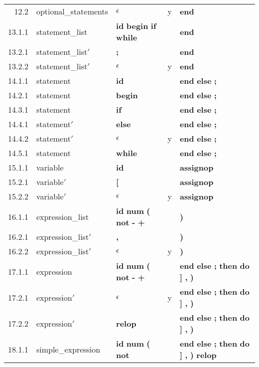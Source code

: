 \begin{center}
\begin{tabular}{rllll}
12.2 & optional\_statements & $\epsilon$ & y & \textbf{end}\\
13.1.1 & statement\_list & \textbf{id} \textbf{begin} \textbf{if} \textbf{while} &  & \textbf{end}\\
13.2.1 & statement\_list$\prime$ & \textbf{;} &  & \textbf{end}\\
13.2.2 & statement\_list$\prime$ & $\epsilon$ & y & \textbf{end}\\
14.1.1 & statement & \textbf{id} &  & \textbf{end} \textbf{else} \textbf{;}\\
14.2.1 & statement & \textbf{begin} &  & \textbf{end} \textbf{else} \textbf{;}\\
14.3.1 & statement & \textbf{if} &  & \textbf{end} \textbf{else} \textbf{;}\\
14.4.1 & statement$\prime$ & \textbf{else} &  & \textbf{end} \textbf{else} \textbf{;}\\
14.4.2 & statement$\prime$ & $\epsilon$ & y & \textbf{end} \textbf{else} \textbf{;}\\
14.5.1 & statement & \textbf{while} &  & \textbf{end} \textbf{else} \textbf{;}\\
15.1.1 & variable & \textbf{id} &  & \textbf{assignop}\\
15.2.1 & variable$\prime$ & \textbf{[} &  & \textbf{assignop}\\
15.2.2 & variable$\prime$ & $\epsilon$ & y & \textbf{assignop}\\
16.1.1 & expression\_list & \textbf{id} \textbf{num} \textbf{(} \textbf{not} \textbf{-} \textbf{+} &  & \textbf{)}\\
16.2.1 & expression\_list$\prime$ & \textbf{,} &  & \textbf{)}\\
16.2.2 & expression\_list$\prime$ & $\epsilon$ & y & \textbf{)}\\
17.1.1 & expression & \textbf{id} \textbf{num} \textbf{(} \textbf{not} \textbf{-} \textbf{+} &  & \textbf{end} \textbf{else} \textbf{;} \textbf{then} \textbf{do} \textbf{]} \textbf{,} \textbf{)}\\
17.2.1 & expression$\prime$ & $\epsilon$ & y & \textbf{end} \textbf{else} \textbf{;} \textbf{then} \textbf{do} \textbf{]} \textbf{,} \textbf{)}\\
17.2.2 & expression$\prime$ & \textbf{relop} &  & \textbf{end} \textbf{else} \textbf{;} \textbf{then} \textbf{do} \textbf{]} \textbf{,} \textbf{)}\\
18.1.1 & simple\_expression & \textbf{id} \textbf{num} \textbf{(} \textbf{not} &  & \textbf{end} \textbf{else} \textbf{;} \textbf{then} \textbf{do} \textbf{]} \textbf{,} \textbf{)} \textbf{relop}\\

\end{tabular}
\end{center}

